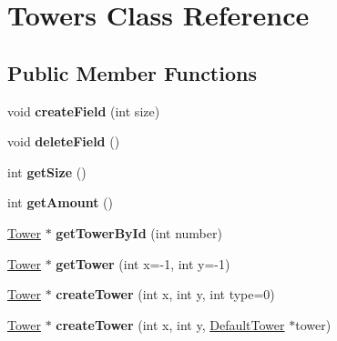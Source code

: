 \hypertarget{class_towers}{}\section{Towers Class Reference}
\label{class_towers}
\subsection*{Public Member Functions}
\begin{DoxyCompactItemize}
\item 
\hypertarget{class_towers_ab63f0e55c93c7ec6ab0262c373551116}{}void {\bfseries create\+Field} (int size)\label{class_towers_ab63f0e55c93c7ec6ab0262c373551116}

\item 
\hypertarget{class_towers_a29b08bed9235647dfe692d9dcc4f9ffc}{}void {\bfseries delete\+Field} ()\label{class_towers_a29b08bed9235647dfe692d9dcc4f9ffc}

\item 
\hypertarget{class_towers_a3da5ae7641ffcab6085b94a9d986425b}{}int {\bfseries get\+Size} ()\label{class_towers_a3da5ae7641ffcab6085b94a9d986425b}

\item 
\hypertarget{class_towers_a10b5b945e11d6f184c96701f458180ff}{}int {\bfseries get\+Amount} ()\label{class_towers_a10b5b945e11d6f184c96701f458180ff}

\item 
\hypertarget{class_towers_a03cca649fafd5693ce6d6d5ab8aebe98}{}\hyperlink{class_tower}{Tower} $\ast$ {\bfseries get\+Tower\+By\+Id} (int number)\label{class_towers_a03cca649fafd5693ce6d6d5ab8aebe98}

\item 
\hypertarget{class_towers_a731bdd8e61d5c3d9c78c0d9b67002438}{}\hyperlink{class_tower}{Tower} $\ast$ {\bfseries get\+Tower} (int x=-\/1, int y=-\/1)\label{class_towers_a731bdd8e61d5c3d9c78c0d9b67002438}

\item 
\hypertarget{class_towers_adb2d5cf17fe1723fcaed221bf8a0bfa9}{}\hyperlink{class_tower}{Tower} $\ast$ {\bfseries create\+Tower} (int x, int y, int type=0)\label{class_towers_adb2d5cf17fe1723fcaed221bf8a0bfa9}

\item 
\hypertarget{class_towers_a79e7782afa38ebc23ce97cd62c9e6ff1}{}\hyperlink{class_tower}{Tower} $\ast$ {\bfseries create\+Tower} (int x, int y, \hyperlink{class_default_tower}{Default\+Tower} $\ast$tower)\label{class_towers_a79e7782afa38ebc23ce97cd62c9e6ff1}


\end{DoxyCompactItemize}

